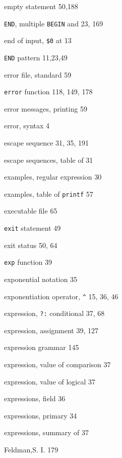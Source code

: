\begin{multicols}{3}
\hangindent=3pc  empty statement 50,188

\hangindent=3pc  \verb'END', multiple \verb'BEGIN' and 23, 169

\hangindent=3pc  end of input, \verb'$0' at 13

\hangindent=3pc  \verb'END' pattern 11,23,49

\hangindent=3pc  error file, standard 59

\hangindent=3pc  \verb'error' function 118, 149, 178

\hangindent=3pc  error messages, printing 59

\hangindent=3pc  error, syntax 4

\hangindent=3pc  escape sequence 31, 35, 191

\hangindent=3pc  escape sequences, table of 31

\hangindent=3pc  examples, regular expression 30

\hangindent=3pc  examples, table of \verb'printf' 57

\hangindent=3pc  executable file 65

\hangindent=3pc  \verb'exit' statement 49

\hangindent=3pc  exit status 50, 64

\hangindent=3pc  \verb'exp' function 39

\hangindent=3pc  exponential notation 35

\hangindent=3pc  exponentiation operator, \verb'^' 15, 36, 46

\hangindent=3pc  expression, \verb'?:' conditional 37, 68

\hangindent=3pc  expression, assignment 39, 127

\hangindent=3pc  expression grammar 145

\hangindent=3pc  expression, value of comparison 37

\hangindent=3pc  expression, value of logical 37

\hangindent=3pc  expressions, field 36

\hangindent=3pc  expressions, primary 34

\hangindent=3pc  expressions, summary of 37

\hangindent=3pc  Feldman,S. I. 179


\end{multicols}
